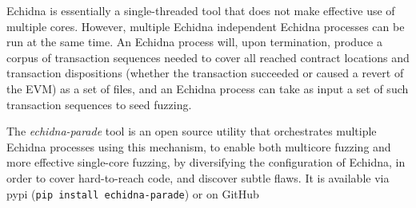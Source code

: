 \documentclass[sigconf,screen]{acmart}
\begin{document}
Echidna is essentially a single-threaded tool that does not make
effective use of multiple cores.  However, multiple Echidna
independent Echidna processes can be run at the same time.  An Echidna
process will, upon termination, produce a corpus of transaction
sequences needed to cover all reached contract locations and
transaction dispositions (whether the transaction succeeded or caused
a revert of the EVM) as a set of files, and an Echidna process can
take as input a set of such transaction sequences to seed fuzzing.

The \emph{echidna-parade} tool is an open source utility that orchestrates multiple
Echidna processes using this mechanism, to enable both multicore
fuzzing and more effective single-core fuzzing, by diversifying the
configuration of Echidna, in order to cover hard-to-reach code, and
discover subtle flaws. It is available via pypi ({\tt pip
    install echidna-parade}) or on GitHub
\end{document}
